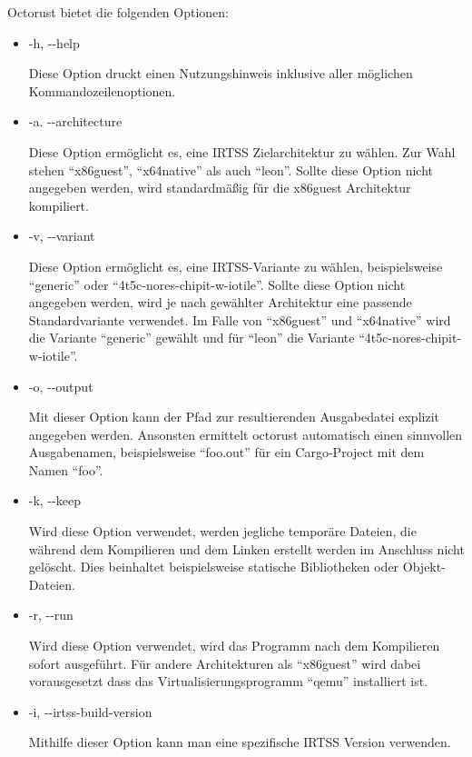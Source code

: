 Octorust bietet die folgenden Optionen:
\begin{itemize}

	\item{-h, -{}-help}
	
	Diese Option druckt einen Nutzungshinweis inklusive aller möglichen Kommandozeilenoptionen.
	
	\item{-a. -{}-architecture}
	
	Diese Option ermöglicht es, eine IRTSS Zielarchitektur zu wählen. Zur Wahl stehen ``x86guest'', ``x64native'' als auch ``leon''.
	Sollte diese Option nicht angegeben werden, wird standardmäßig für die x86guest Architektur kompiliert.
	
	\item{-v, -{}-variant}
	
	Diese Option ermöglicht es, eine IRTSS-Variante zu wählen, beispielsweise ``generic'' oder 	``4t5c-nores-chipit-w-iotile''.
	Sollte diese Option nicht angegeben werden, wird je nach gewählter Architektur eine passende Standardvariante verwendet.
	Im Falle von ``x86guest'' und ``x64native'' wird die Variante ``generic'' gewählt und für ``leon'' die Variante
	``4t5c-nores-chipit-w-iotile''.
	
	\item{-o, -{}-output}
	
	Mit dieser Option kann der Pfad zur resultierenden Ausgabedatei explizit angegeben	werden. Ansonsten ermittelt octorust
	automatisch einen sinnvollen Ausgabenamen, beispielsweise ``foo.out'' für ein Cargo-Project mit dem Namen ``foo''.
	
	\item{-k, -{}-keep}
	
	Wird diese Option verwendet, werden jegliche temporäre Dateien, die während dem Kompilieren und dem Linken erstellt werden im
	Anschluss nicht gelöscht. Dies beinhaltet beispielsweise statische Bibliotheken oder Objekt-Dateien.
	
	\item{-r, -{}-run}
	
	Wird diese Option verwendet, wird das Programm nach dem Kompilieren sofort ausgeführt. Für andere Architekturen als
	``x86guest'' wird dabei vorausgesetzt dass das Virtualisierungsprogramm ``qemu'' installiert ist.
	
	\item{-i, -{}-irtss-build-version}

	Mithilfe dieser Option kann man eine spezifische IRTSS Version verwenden.
	

\end{itemize}
